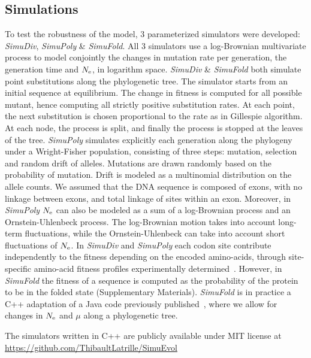\subsection{Simulations}
\label{sec:Simulation}
To test the robustness of the model, $3$ parameterized simulators were developed: \textit{SimuDiv}, \textit{SimuPoly} \& \textit{SimuFold}.
All $3$ simulators use a log-Brownian multivariate process to model conjointly the changes in mutation rate per generation, the generation time and $N_{\mathrm{e}}$, in logarithm space.
\textit{SimuDiv} \& \textit{SimuFold} both simulate point \glspl{substitution} along the phylogenetic tree.
The simulator starts from an initial sequence at equilibrium.
The change in fitness is computed for all possible mutant, hence computing all strictly positive \gls{substitution} rates.
At each point, the next \gls{substitution} is chosen proportional to the rate as in Gillespie algorithm.
At each node, the process is split, and finally the process is stopped at the leaves of the tree.
\textit{SimuPoly} simulates explicitly each generation along the phylogeny under a Wright-Fisher population, consisting of three steps: mutation, selection and random drift of \glspl{allele}.
Mutations are drawn randomly based on the probability of mutation.
Drift is modeled as a multinomial distribution on the \gls{allele} counts.
We assumed that the \acrshort{DNA} sequence is composed of exons, with no linkage between exons, and total linkage of sites within an exon.
Moreover, in \textit{SimuPoly} $N_{\mathrm{e}}$ can also be modeled as a sum of a log-Brownian process and an Ornstein-Uhlenbeck process.
The log-Brownian motion takes into account long-term fluctuations, while the Ornstein-Uhlenbeck can take into account short fluctuations of $N_{\mathrm{e}}$.
In \textit{SimuDiv} and \textit{SimuPoly} each \gls{codon} site contribute independently to the fitness depending on the encoded amino-acids, through site-specific amino-acid fitness profiles experimentally determined~\citep{Bloom2017}.
However, in \textit{SimuFold} the fitness of a sequence is computed as the probability of the protein to be in the folded state (Supplementary Materials).
\textit{SimuFold} is in practice a C++ adaptation of a Java code previously published~\citep{Goldstein2016, Goldstein2017}, where we allow for changes in $N_{\mathrm{e}}$ and $\mu$ along a phylogenetic tree.

The simulators written in C++ are publicly available under MIT license at \url{https://github.com/ThibaultLatrille/SimuEvol}
